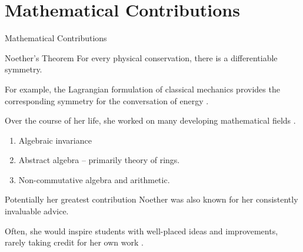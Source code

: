 \documentclass[10pt]{beamer}
\begin{document}
\section{Mathematical Contributions}
\begin{frame}{Mathematical Contributions}
\begin{block}{Noether's Theorem}
For every physical conservation, there is a differentiable symmetry.

For example, the Lagrangian formulation of classical mechanics provides the corresponding symmetry for the conversation of energy \cite{biography}.
\end{block}

Over the course of her life, she worked on many developing mathematical fields \cite{biography}.
\begin{enumerate}
\item Algebraic invariance
\item Abstract algebra -- primarily theory of rings.
\item Non-commutative algebra and arithmetic.
\end{enumerate}

\begin{alertblock}{Potentially her greatest contribution}
Noether was also known for her consistently invaluable advice. 

Often, she would inspire students with well-placed ideas and improvements,
rarely taking credit for her own work \cite{wikipedia}.
\end{alertblock}
\end{frame}
\end{document}
